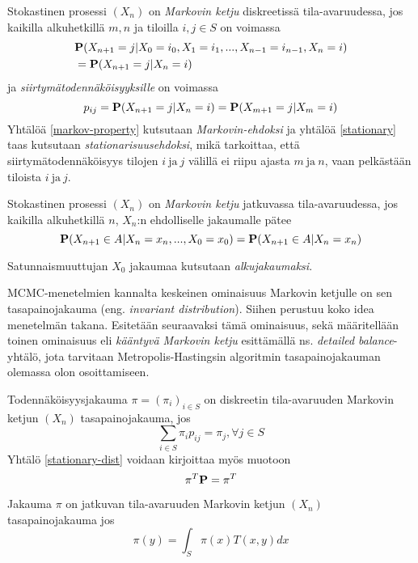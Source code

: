 \begin{maar}\label{markovin-ehto-d}
	Stokastinen prosessi $(X_n)$ on \textit{Markovin ketju} diskreetissä tila-avaruudessa, jos kaikilla alkuhetkillä $m,n$ ja tiloilla $i,j\in S$ on voimassa
	\begin{equation}\label{markov-property}
		\begin{split}
			&\textbf{P}(X_{n+1}=j|X_0=i_0,X_1=i_1,...,X_{n-1}=i_{n-1},X_n=i) \\
		 &= \textbf{P}(X_{n+1}=j|X_n=i) 
		\end{split}
	\end{equation}
	ja \textit{siirtymätodennäköisyyksille} on voimassa 
	\begin{equation}\label{stationary}
		p_{ij}=\textbf{P}(X_{n+1}=j|X_n=i)=\textbf{P}(X_{m+1}=j|X_m=i)
	\end{equation}
	Yhtälöä \ref{markov-property} kutsutaan \textit{Markovin-ehdoksi} ja yhtälöä \ref{stationary} taas kutsutaan \textit{stationarisuusehdoksi}, mikä tarkoittaa, 
	että siirtymätodennäköisyys tilojen $i\ \text{ja}\ j$ välillä ei riipu ajasta $m\ \text{ja}\ n$, vaan pelkästään tiloista $i\ \text{ja}\ j$.
\end{maar}

\begin{maar}\label{markov-maar-c}
	Stokastinen prosessi $(X_n)$ on \textit{Markovin ketju} jatkuvassa tila-avaruudessa, jos kaikilla alkuhetkillä $n$, $X_n$:n ehdolliselle jakaumalle pätee
	\begin{equation}
		\textbf{P}(X_{n+1} \in A | X_n=x_{n},...,X_0=x_0) = \textbf{P}(X_{n+1}\in A | X_n=x_{n})
	\end{equation}
\end{maar}

\begin{maar}
	Satunnaismuuttujan $X_0$ jakaumaa kutsutaan \textit{alkujakaumaksi}. 
\end{maar}

MCMC-menetelmien kannalta keskeinen ominaisuus Markovin ketjulle on sen tasapainojakauma (eng. \textit{invariant distribution}). Siihen perustuu koko idea menetelmän takana. Esitetään seuraavaksi tämä ominaisuus, sekä määritellään toinen ominaisuus eli \textit{kääntyvä Markovin ketju} esittämällä ns. \textit{detailed balance}-yhtälö, jota tarvitaan Metropolis-Hastingsin algoritmin tasapainojakauman olemassa olon osoittamiseen. 

\begin{maar}
	Todennäköisyysjakauma $\pi=(\pi_i)_{i\in S}$ on diskreetin tila-avaruuden Markovin ketjun $(X_n)$ tasapainojakauma, jos 
	\begin{equation}\label{stationary-dist}
		\sum_{i\in S} \pi_i p_{ij}=\pi_j, \forall j\in S
	\end{equation}
	Yhtälö \ref{stationary-dist} voidaan kirjoittaa myös muotoon 
	\begin{equation}\label{stationary-dist2}
		\pi^T\textbf{P}= \pi^T
	\end{equation}
	
	Jakauma $\pi$ on jatkuvan tila-avaruuden Markovin ketjun $( X_n )$ tasapainojakauma jos 
	\begin{equation}
		\pi(y) = \int_S \pi(x) T(x,y) dx
	\end{equation}
\end{maar}


